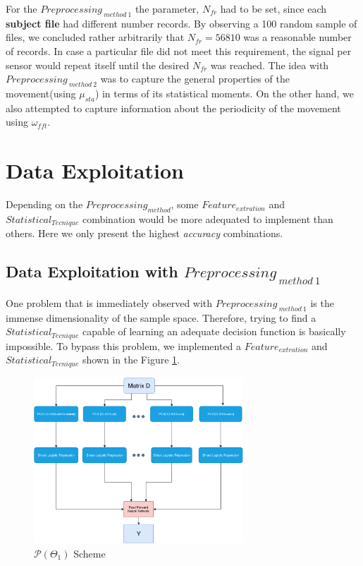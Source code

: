  For the $Preprocessing_{ \ method \ 1}$ the parameter, $N_{fr}$ had to be set, since each \textbf{subject file} had different number records. By observing a 100 random sample of files, we concluded rather arbitrarily that  $N_{fr}=56810$  was a reasonable number of records. In case a particular file did not meet this requirement, the signal per sensor would repeat itself until the desired $N_{fr}$ was reached. The idea with $Preprocessing_{ \ method \ 2}$ was to capture the general properties of the movement(using $\mu_{sta}$) in terms of its statistical moments. On the other hand, we also attempted to capture information about the periodicity of the movement using $\omega_{fft}$.


\section{Data Exploitation}

Depending on the $Preprocessing_{method}$, some $Feature_{extration}$ and $Statistical_{Tecnique}$ combination would be more adequated to implement than others. Here we only present the highest \textit{accuracy} combinations.

\subsection{Data Exploitation with $Preprocessing_{ \ method \ 1}$}

One problem that is immediately observed with $Preprocessing_{ \ method \ 1}$ is the immense dimensionality of the sample space. Therefore, trying to find a $Statistical_{Tecnique}$  capable of learning an adequate decision function is basically impossible. To bypass this problem, we implemented a $Feature_{extration}$ and $Statistical_{Tecnique}$ shown in the Figure \ref{dig:p1}.


\begin{figure}[htpb!]
	\centering
	\includegraphics[width=0.7\textwidth]{images/scheme_1.pdf}
	\caption{$\mathcal{P}(\Theta_{1})$  Scheme}
	\label{dig:p1}
\end{figure}

